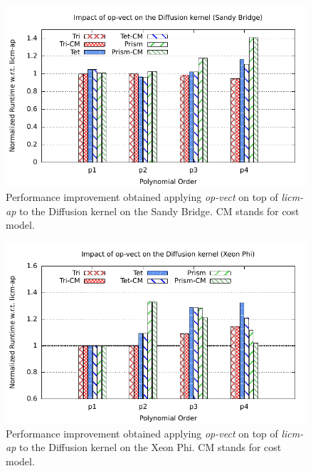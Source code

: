 \documentclass[conference]{IEEEtran}
\begin{document}
\begin{figure}[h]
\includegraphics[scale=0.7]{Pictures/diffusion-normalized-opvect.pdf}
\caption{Performance improvement obtained applying \emph{op-vect} on top of \emph{licm-ap} to the Diffusion kernel on the Sandy Bridge. CM stands for cost model.}
\label{fig:opvect-diffusion-speedup}
\end{figure}

\begin{figure}[h]
\includegraphics[scale=0.7]{Pictures/diffusion-normalized-opvect-phi.pdf}
\caption{Performance improvement obtained applying \emph{op-vect} on top of \emph{licm-ap} to the Diffusion kernel on the Xeon Phi. CM stands for cost model.}
\label{fig:opvect-diffusion-speedup-phi}
\end{figure}

\end{document}
